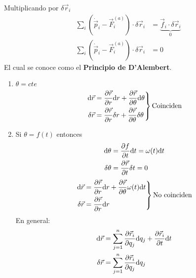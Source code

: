 \documentclass[../main]{subfiles}
\begin{document}
\begin{itemize}
    Multiplicando por $\delta \vec{r}_i$
    \begin{equation}
        \begin{split}
            \sum_i \left(\dot{\vec{p}}_i-\vec{F}^{(a)}_i\right)\cdot \delta \vec{r}_i &= \underbrace{\vec{f}_i \cdot \delta \vec{r}_i}_{0}\\
            \sum_i \left(\dot{\vec{p}}_i-\vec{F}^{(a)}_i\right)\cdot \delta \vec{r}_i &= 0
        \end{split}
    \end{equation}
    El cual se conoce como el \textbf{Principio de D'Alembert}.
\end{itemize}


\begin{enumerate}
    \item $\theta=cte$
    \begin{equation*}
        \left.
        \begin{split}
            \mathrm{d}\vec{r}&=\pdv{\vec{r}}{r}\mathrm{d}r+\pdv{\vec{r}}{\theta}\mathrm{d}\theta \\
            \delta \vec{r}&=\pdv{\vec{r}}{r}\delta r+\pdv{\vec{r}}{\theta}\delta \theta
        \end{split}
        \right\}
        \text{Coinciden}
    \end{equation*}
    \item Si $\theta=f(t)$ entonces
    \begin{align*}
        \mathrm{d}\theta&=\pdv{f}{t}\mathrm{d}t=\omega(t)\mathrm{d}t \\
        \delta \theta &=\pdv{\vec{r}}{t}\delta t=0
    \end{align*}
    \begin{equation*}
        \left.
        \begin{split}
            \mathrm{d}\vec{r}&=\pdv{\vec{r}}{r}\mathrm{d}r+\pdv{\vec{r}}{\theta}\omega(t)\mathrm{d}t \\
            \delta \vec{r}&=\pdv{\vec{r}}{r}\mathrm{d}r
        \end{split}
        \right\}
        \text{No coinciden}
    \end{equation*}
    En general:
    \begin{align*}
        \mathrm{d}\vec{r}&=\sum_{j=1}^n \pdv{\vec{r}_i}{q_j}\mathrm{d}q_j+\pdv{\vec{r}_i}{t}\mathrm{d}t \\
        \delta \vec{r}&=\sum_{j=1}^n \pdv{\vec{r}_i}{q_j} \mathrm{d}q_j
    \end{align*}
\end{enumerate}
\end{document}
